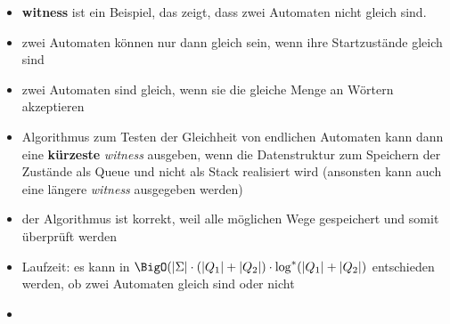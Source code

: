 \begin{itemize}
	\item \textbf{witness} ist ein Beispiel, das zeigt, dass zwei Automaten nicht gleich sind.
	\item zwei Automaten können nur dann gleich sein, wenn ihre Startzustände gleich sind
	\item zwei Automaten sind gleich, wenn sie die gleiche Menge an Wörtern akzeptieren
	\item Algorithmus zum Testen der Gleichheit von endlichen Automaten kann dann eine \textbf{kürzeste} \emph{witness} ausgeben, wenn die Datenstruktur zum Speichern der Zustände als Queue und nicht als Stack realisiert wird (ansonsten kann auch eine längere \textit{witness} ausgegeben werden)
	\item der Algorithmus ist korrekt, weil alle möglichen Wege gespeichert und somit überprüft werden
	\item Laufzeit: es kann in $\BigO(|\Sigma|\cdot (|Q_1|+|Q_2|)\cdot \log^{*}(|Q_1|+|Q_2|)$ entschieden werden, ob zwei Automaten gleich sind oder nicht
	\item %
\end{itemize}

